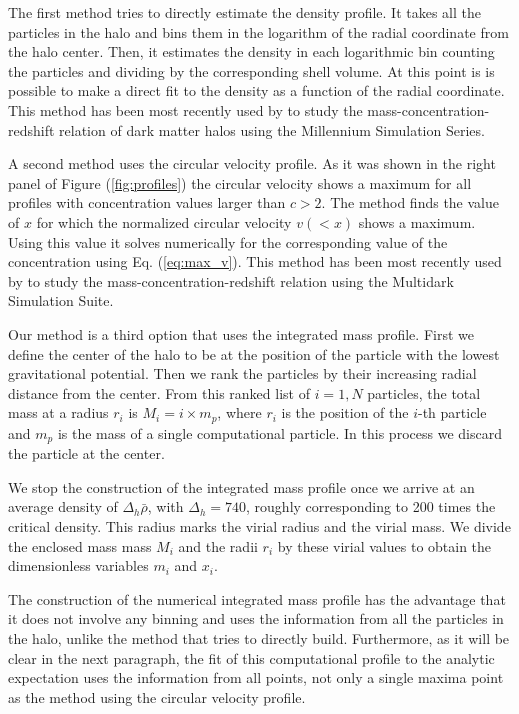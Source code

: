 \documentclass[useAMS,usenatbib]{mn2e}
\begin{document}
The first method tries to directly estimate the density profile.
It takes all the particles in the halo and bins them in the logarithm
of the radial coordinate from the halo center.
Then, it estimates the density in each logarithmic bin counting the
particles and dividing by the corresponding shell volume.
At this point is is possible to make a direct fit to the density as a
function of the radial coordinate.
This method has been most recently used by \cite{Ludlow2014} to study
the mass-concentration-redshift relation of dark matter halos using
the Millennium Simulation Series.

A second method uses the circular velocity profile.
As it was shown in the right panel of Figure (\ref{fig:profiles}) the
circular velocity shows a maximum for all profiles with concentration
values larger than $c>2$.
The method finds the value of $x$ for which the normalized circular
velocity $v(<x)$ shows a maximum.
Using this value it solves numerically for the corresponding value of
the concentration using Eq. (\ref{eq:max_v}).
This method has been most recently used by \cite{Klypin2014} to study
the mass-concentration-redshift relation using the Multidark
Simulation Suite.

Our method is a third option that uses the integrated mass profile.
First we define the center of the halo to be at the position of the
particle with the lowest gravitational potential.
Then we rank the particles by their increasing radial distance from
the center.
From this ranked list of $i=1,N$ particles, the total mass at a radius
$r_i$ is $M_i=i\times m_p$, where $r_i$ is
the position of the $i$-th particle and $m_p$ is the mass of a single
computational particle.
In this process we discard the particle at the center.

We stop the construction of the integrated mass profile once we arrive
at an average density of $\Delta_h\bar{\rho}$, with $\Delta_h=740$,
roughly corresponding to 200 times the critical density.
This radius marks the virial radius and the virial mass.
We divide the enclosed mass mass $M_i$ and the radii $r_i$ by these
virial values to obtain the dimensionless variables $m_i$ and $x_i$.

The construction of the numerical integrated mass profile has the
advantage that it does not involve any binning and uses the
information from all the particles in the halo, unlike the method that
tries to directly build.
Furthermore, as it will be clear in the next paragraph, the fit of
this computational profile to the analytic expectation uses the
information from all points, not only a single maxima point as the
method using the circular velocity profile.
\end{document}
